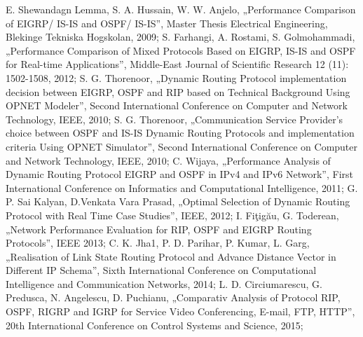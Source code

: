 \documentclass[conference,compsoc]{IEEEtran}
\begin{document}
%
%
%
\newpage
\begin{thebibliography}{1}

E. Shewandagn Lemma, S. A. Hussain, W. W. Anjelo, „Performance Comparison of EIGRP/ IS-IS and OSPF/ IS-IS”, Master Thesis Electrical Engineering, Blekinge Tekniska Hogskolan, 2009;
S. Farhangi, A. Rostami, S. Golmohammadi, „Performance Comparison of Mixed Protocols Based on EIGRP, IS-IS and OSPF for Real-time Applications”, Middle-East Journal of Scientific Research 12 (11): 1502-1508, 2012;
S. G. Thorenoor, „Dynamic Routing Protocol implementation decision between EIGRP, OSPF and RIP based on Technical Background Using OPNET Modeler”, Second International Conference on Computer and Network Technology, IEEE, 2010;
S. G. Thorenoor, „Communication Service Provider’s choice between OSPF and IS-IS Dynamic Routing Protocols and implementation criteria Using OPNET Simulator”, Second International Conference on Computer and Network Technology, IEEE, 2010;
C. Wijaya, „Performance Analysis of Dynamic Routing Protocol EIGRP and OSPF in IPv4 and IPv6 Network”, First International Conference on Informatics and Computational Intelligence, 2011;
G. P. Sai Kalyan, D.Venkata Vara Prasad, „Optimal Selection of Dynamic Routing Protocol with Real Time Case Studies”, IEEE, 2012;
I. Fiţigău, G. Toderean, „Network Performance Evaluation for RIP, OSPF and EIGRP Routing Protocols”, IEEE 2013;
C. K. Jha1, P. D. Parihar, P. Kumar, L. Garg, „Realisation of Link State Routing Protocol and Advance Distance Vector in Different IP Schema”, Sixth International Conference on Computational Intelligence and Communication Networks, 2014;
L. D. Circiumarescu, G. Predusca, N. Angelescu, D. Puchianu, „Comparativ Analysis of Protocol RIP, OSPF, RIGRP and IGRP for Service Video Conferencing, E-mail, FTP, HTTP”, 20th International Conference on Control Systems and Science, 2015;

\end{thebibliography}
\end{document}
